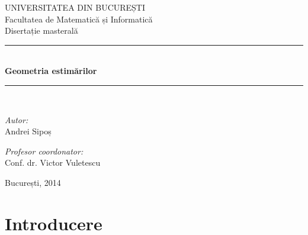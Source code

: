 \documentclass[13pt,openany,oneside]{book}
\begin{document}
\newtheorem{teo}{\bf Teorema}[chapter]
\newtheorem{cor}[teo]{\bf Corolarul}
\newtheorem{lema}[teo]{\bf Lema}
\newtheorem{prob}[teo]{\bf Problema}
\newtheorem{conj}[teo]{\bf Conjectura}
\newtheorem{propr}[teo]{\bf Proprietatea}
\newtheorem{prop}[teo]{\bf Propoziția}
\newtheorem{alg}[teo]{\bf Algoritmul}
\theoremstyle{remark}
\newtheorem{obs}[teo]{\bf Observația}
\newtheorem{obss}[teo]{\bf Observațiile}
\newtheorem{ex}[teo]{\bf Exemplul}
\newtheorem{exs}[teo]{\bf Exemplele}
\theoremstyle{definition}
\newtheorem{defi}[teo]{\bf Definiția}

\newcommand{\calm}{\mathcal{M}}
\newcommand{\Qell}{\mathbb{Q}_\ell}

\setcounter{page}{1}
\fontsize{4.3mm}{6mm}\selectfont
\pagestyle{empty}
\begin{center}

\LARGE UNIVERSITATEA DIN BUCUREȘTI\\[0.5cm]
\LARGE Facultatea de Matematică și Informatică\\[3cm]

\Large Disertație masterală\\[3.5cm] 
 
\rule{8cm}{0.5mm}\\[0.8cm]
{ \huge \bfseries Geometria estimărilor}\\[0.2cm]
\rule{8cm}{0.5mm}\\[2.5cm]

\begin{minipage}{0.4\textwidth}
\begin{flushleft} \large
\emph{Autor:}\\
Andrei Sipoș
\end{flushleft}
\end{minipage}
\begin{minipage}{0.5\textwidth}
\begin{flushright} \large
\emph{Profesor coordonator:} \\
Conf. dr. Victor Vuletescu
\end{flushright}
\end{minipage}

\vfill

{\large București, 2014}

\end{center}
\newpage

\tableofcontents

\newpage

\setlength{\parskip}{1.5ex plus 0.5ex minus 0.2ex}
\chapter{Introducere}
\end{document}
